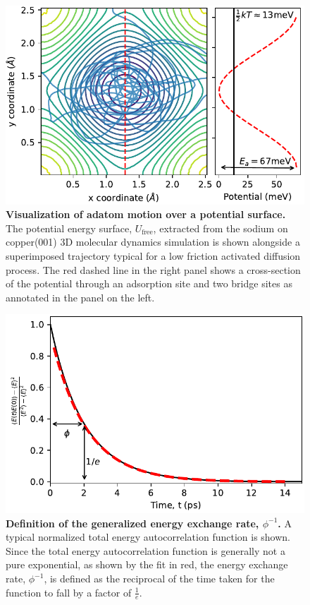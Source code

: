 \documentclass[7pt]{article}
\begin{document}
\begin{figure}
	\centering
	\includegraphics[width=1.0\columnwidth]{pot_surface}
	\caption{\textbf{Visualization of adatom motion over a potential surface.} The potential energy surface, $U_{\text{free}}$, extracted from the sodium on copper(001) 3D molecular dynamics simulation is shown alongside a superimposed trajectory typical for a low friction activated diffusion process. The red dashed line in the right panel shows a cross-section of the potential through an adsorption site and two bridge sites as annotated in the panel on the left.}
	\label{fig:pot_surface}
\end{figure}

\begin{figure}
	\centering
	\includegraphics[width=1.0\columnwidth]{e_auto}
	\caption{\textbf{Definition of the generalized energy exchange rate, $\phi^{-1}$.} A typical normalized total energy autocorrelation function is shown. Since the total energy autocorrelation function is generally not a pure exponential, as shown by the fit in red, the energy exchange rate, $\phi^{-1}$, is defined as the reciprocal of the time taken for the function to fall by a factor of $\frac{1}{e}$.}
	\label{fig:e_auto}
\end{figure}
\end{document}
